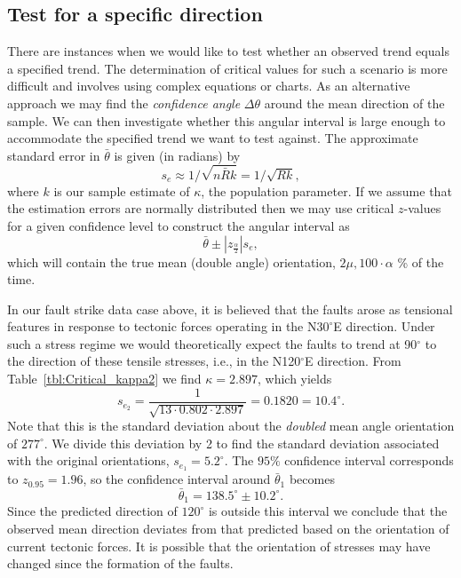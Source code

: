 \subsection{Test for a specific direction}

	There are instances when we would like to test whether an observed trend equals a 
specified trend.  The determination of critical values for such a scenario is more difficult and involves 
using complex equations or charts.  As an alternative approach we may find the \emph{confidence angle} $\Delta \theta$ around
the mean direction of the sample. We can then investigate whether this angular interval is large enough to accommodate the specified trend
we want to test against.  The approximate standard error in $\bar{\theta}$ is given (in radians) by
\begin{equation}
s_e \approx 1/\sqrt{n \bar{R}k} = 1/\sqrt{Rk},
\end{equation}
where $k$ is our sample estimate of $\kappa$, the population parameter.  If we assume that the estimation errors are normally distributed
then we may use critical $z$-values for a given confidence level to construct the angular interval as
\begin{equation}
\bar{\theta} \pm \left | z_{\frac{\alpha}{2}} \right | s_e,
\end{equation}	 
which will contain the true mean (double angle) orientation, $2\mu, 100\cdot\alpha$ \% of the time.
\begin{example}
In our fault strike data case above,
it is believed that the faults arose as tensional features in response to tectonic forces operating in the N$30^{\circ}$E
direction.  Under such a stress regime we would theoretically expect the faults to trend at 90$^{\circ}$ to the direction of these tensile
stresses, i.e., in the N120$^{\circ}$E direction.  From Table~\ref{tbl:Critical_kappa2} we find $\kappa =2.897$, which yields
\begin{equation}
s_{e_2} = \frac{1}{ \sqrt{13 \cdot 0.802 \cdot  2.897}} = 0.1820 = 10.4^{\circ}.
\end{equation}
Note that this is the standard deviation about the \emph{doubled} mean angle orientation of $277^{\circ}$.  We divide this deviation by
2 to find the standard deviation associated with the original orientations, $s_{e_1} = 5.2^{\circ}$.  The 
$95 \%$ confidence interval corresponds to $z_{0.95} = 1.96$, so the confidence interval around $\bar{\theta}_1$ becomes	 
\begin{equation}
\bar{\theta}_1 = 138.5^{\circ} \pm 10.2^{\circ}.
\end{equation}
Since the predicted direction of $120^{\circ}$ is outside this interval we conclude that the observed
mean direction deviates from that predicted based on the orientation of current tectonic forces.  It is possible that the
orientation of stresses may have changed since the formation of the faults.
\end{example}


